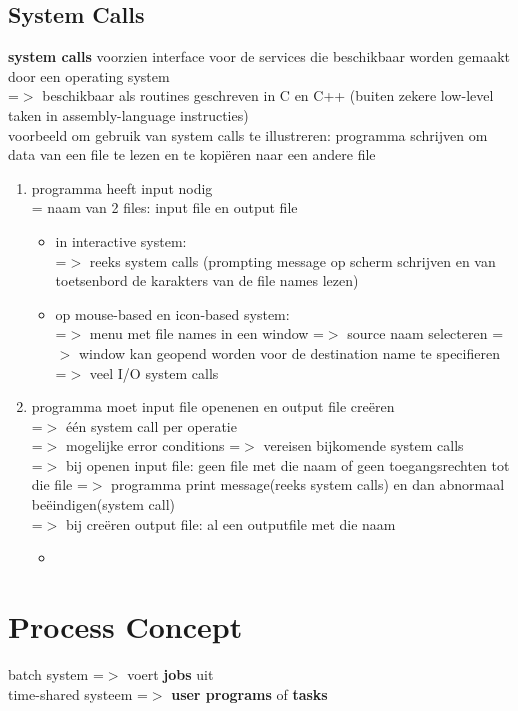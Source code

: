 \documentclass{report}
\begin{document}
\section{System Calls}
\textbf{system calls} voorzien interface voor de services die beschikbaar worden gemaakt door een operating system 
\\=$>$ beschikbaar als routines geschreven in C en C++ (buiten zekere low-level taken in assembly-language instructies)
\\ voorbeeld om gebruik van system calls te illustreren: programma schrijven om data van een file te lezen en te kopi\"eren naar een andere file
\begin{enumerate}
\item programma heeft input nodig
\\= naam van 2 files: input file en output file
\begin{itemize}
\item in interactive system:
\\=$>$ reeks system calls (prompting message op scherm schrijven en van toetsenbord de karakters van de file names lezen)
\item op mouse-based en icon-based system:
\\=$>$ menu met file names in een window =$>$ source naam selecteren =$>$ window kan geopend worden voor de destination name te specifieren
\\=$>$ veel I/O system calls
\end{itemize}
\item programma moet input file openenen en output file cre\"eren
\\=$>$ \'e\'en system call per operatie
\\=$>$ mogelijke error conditions =$>$ vereisen bijkomende system calls
\\=$>$ bij openen input file: geen file met die naam of geen toegangsrechten tot die file =$>$ programma print message(reeks system calls) en dan abnormaal be\"eindigen(system call)
\\=$>$ bij cre\"eren output file: al een outputfile met die naam
\begin {itemize}
\item 
\end {itemize}

\end{enumerate}


\chapter{Process Concept}
batch system =$>$ voert \textbf{jobs} uit
\\time-shared systeem =$>$ \textbf{user programs} of \textbf{tasks}
\end{document}

